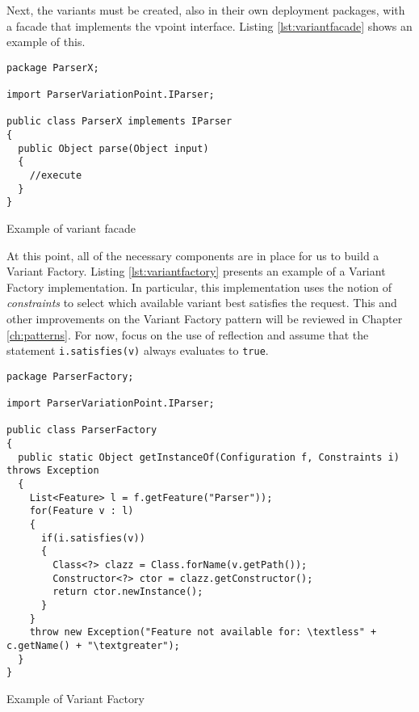 Next, the \gls{variant}s must be created, also in their own deployment packages, with a facade that implements the \gls{vpoint} interface. Listing \ref{lst:variantfacade} shows an example of this.

\begin{listing}
\begin{verbatim}
package ParserX;

import ParserVariationPoint.IParser;

public class ParserX implements IParser
{
  public Object parse(Object input)
  {
    //execute
  }
}
\end{verbatim}
\caption{Example of \gls{variant} facade} \label{lst:variantfacade}
\end{listing}

At this point, all of the necessary components are in place for us to build a Variant Factory. Listing \ref{lst:variantfactory} presents an example of a Variant Factory implementation. In particular, this implementation uses the notion of \emph{constraints} to select which available \gls{variant} best satisfies the request. This and other improvements on the Variant Factory pattern will be reviewed in Chapter \ref{ch:patterns}. For now, focus on the use of reflection and assume that the statement \lstinline{i.satisfies(v)} always evaluates to \lstinline{true}.

\begin{listing}
\begin{verbatim}
package ParserFactory;

import ParserVariationPoint.IParser;

public class ParserFactory
{
  public static Object getInstanceOf(Configuration f, Constraints i) throws Exception
  {
    List<Feature> l = f.getFeature("Parser"));
    for(Feature v : l)
    {
      if(i.satisfies(v))
      {
        Class<?> clazz = Class.forName(v.getPath());
        Constructor<?> ctor = clazz.getConstructor();
        return ctor.newInstance();
      }
    }
    throw new Exception("Feature not available for: \textless" + c.getName() + "\textgreater");
  }
}
\end{verbatim}
\caption{Example of Variant Factory} \label{lst:variantfactory}
\end{listing}

